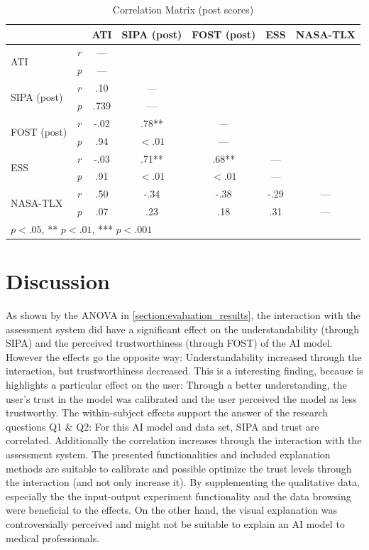 \documentclass[11pt,a4paper,english]{scrreprt}
\begin{document}
\begin{table}[htbp]
    \centering
    \begin{tabularx}{0.9\textwidth}{ l l c c c c c }
        \toprule
        & & ATI & SIPA (post) & FOST (post) & ESS & NASA-TLX \\
        \midrule
        \multirow[t]{2}{*}{ATI} & \textit{r} & --- & & & & \\
        & \textit{p} & --- & & & & \\
        \multirow[t]{2}{*}{SIPA (post)} & \textit{r} & .10 & --- & & & \\
        & \textit{p} & .739 & --- & & & \\
        \multirow[t]{2}{*}{FOST (post)} & \textit{r} & -.02 & .78** & --- & & \\
        & \textit{p} & .94 & $<.01$ & --- & & \\
        \multirow[t]{2}{*}{ESS} & \textit{r} & -.03 & .71** & .68** & --- & \\
        & \textit{p} & .91 & $<.01$ & $<.01$ & --- & \\
        \multirow[t]{2}{*}{NASA-TLX} & \textit{r} & .50 & -.34 & -.38 & -.29 & --- \\
        & \textit{p} & .07 & .23 & .18 & .31 & --- \\
        \bottomrule
        \multicolumn{7}{l}{\footnotesize * $\textit{p}<.05$, ** $\textit{p}<.01$, *** $\textit{p}<.001$} \\
    \end{tabularx}
    \caption{Correlation Matrix (post scores)}
    \label{table:correlation_matrix_post}
\end{table}

\section{Discussion}
As shown by the ANOVA in \autoref{section:evaluation_results}, the interaction with the assessment system did have a significant effect on the understandability (through SIPA) and the perceived trustworthiness (through FOST) of the AI model. However the effects go the opposite way: Understandability increased through the interaction, but trustworthiness decreased. This is a interesting finding, because is highlights a particular effect on the user: Through a better understanding, the user's trust in the model was calibrated and the user perceived the model as less trustworthy. The within-subject effects support the answer of the research questions Q1 \& Q2: For this AI model and data set, SIPA and trust are correlated. Additionally the correlation increases through the interaction with the assessment system. The presented functionalities and included explanation methods are suitable to calibrate and possible optimize the trust levels through the interaction (and not only increase it). By supplementing the qualitative data, especially the the input-output experiment functionality and the data browsing were beneficial to the effects. On the other hand, the visual explanation was controversially perceived and might not be suitable to explain an AI model to medical professionals. 
\end{document}
